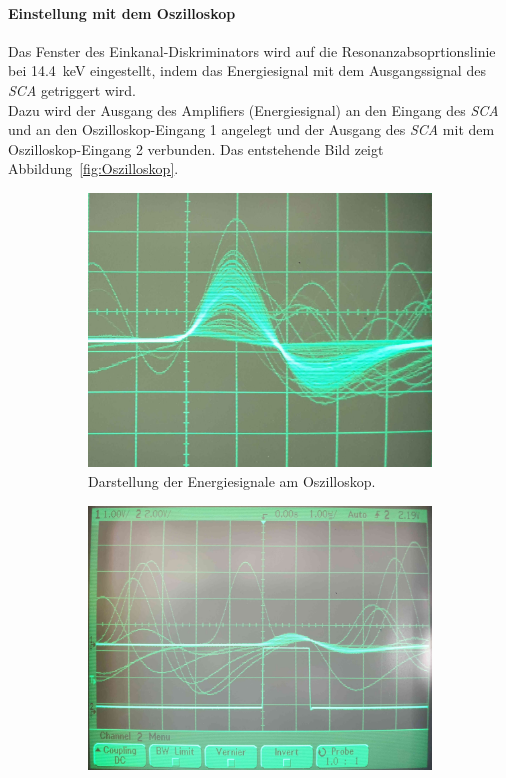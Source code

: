 \documentclass[a4paper,twoside,final]{article}
\begin{document}
\paragraph{Einstellung mit dem Oszilloskop}
Das Fenster des Einkanal-Diskriminators wird auf die Resonanzabsoprtionslinie bei \SI{14,4}{\kilo\electronvolt} eingestellt, indem das Energiesignal mit dem Ausgangssignal des \textit{SCA} getriggert wird. \\
Dazu wird der Ausgang des Amplifiers (Energiesignal) an den Eingang des \textit{SCA}
und an den Oszilloskop-Eingang 1 angelegt und der Ausgang des \textit{SCA} mit dem Oszilloskop-Eingang 2 verbunden. Das entstehende Bild zeigt Abbildung~\ref{fig:Oszilloskop}.
\begin{figure}[htp]
    \centering
    \begin{subfigure}{0.45\textwidth}
        \includegraphics[width=\textwidth]{Bilder/1209_151002.jpg}
        \caption{Darstellung der Energiesignale am Oszilloskop.}
    \end{subfigure}
    \hspace{1cm}
    \begin{subfigure}{0.45\textwidth}
        \includegraphics[width=\textwidth]{Bilder/1210_125430.jpg}

\end{subfigure}
\end{figure}
\end{document}
